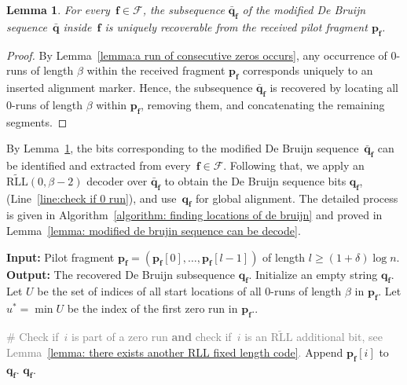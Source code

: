 \documentclass[journal,letterpaper,onecolumn,11pt]{IEEEtran}
\newcommand{\cF}{\mathcal{F}}
\newcommand{\boldf}{\mathbf{f}}
\newcommand{\boldp}{\mathbf{p}}
\newcommand{\boldq}{\mathbf{q}}
\newtheorem{lemma}{Lemma}
\newcommand{\gray}[1]{\textcolor{gray}{#1}}
\begin{document}
\begin{lemma}\label{lemma:correctly identify modified db from pilot}
For every~$\boldf\in \cF$, the subsequence $\bar{\mathbf{q}}_{\boldf}$ of the modified De Bruijn sequence~$\bar{\boldq}$ inside~$\boldf$ is uniquely recoverable from the received pilot fragment $\mathbf{p}_{\boldf}$.
\end{lemma}
\begin{proof}
By Lemma~\ref{lemma:a run of consecutive zeros occurs}, any occurrence of $0$-runs of length $\beta$  within the received fragment $\mathbf{p}_{\boldf}$ corresponds uniquely to an inserted alignment marker.
Hence, the subsequence $\bar{\mathbf{q}}_{\boldf}$ is recovered by locating all $0$-runs of length $\beta$ within $\mathbf{p}_{\boldf}$, removing them, and concatenating the remaining segments.
\end{proof}
By Lemma~\ref{lemma:correctly identify modified db from pilot}, the bits corresponding to the modified De Bruijn sequence~$\bar{\mathbf{q}}_{\boldf}$ can be identified and extracted from every~$\boldf\in \cF$.
Following that, we apply an $\widetilde{\mathrm{RLL}}(0,\beta-2)$ decoder over $\bar{\mathbf{q}}_{\boldf}$ to obtain the De Bruijn sequence bits $\mathbf{q}_{\boldf}$, (Line~\ref{line:check if 0 run}), and use~$\boldq_\boldf$ for global alignment.
The detailed process is given in Algorithm~\ref{algorithm: finding locations of de bruijn} and proved in Lemma~\ref{lemma: modified de brujin sequence can be decode}.
\begin{algorithm}
\caption{Extraction of De Bruijn subsequence $\boldq_{\boldf}$ from a pilot fragment $\boldp_{\boldf}$} 
\begin{algorithmic}[1]\label{algorithm: finding locations of de bruijn}
\STATE \textbf{Input:} Pilot fragment $\mathbf{p}_{\boldf} = (\mathbf{p}_{\boldf}[0], \dots, \mathbf{p}_{\boldf}[l-1])$ of length $l \geq (1+\delta)\log n$.
\STATE \textbf{Output:} The recovered De Bruijn subsequence $\boldq_\boldf$.
\STATE Initialize an empty string $\mathbf{q}_{\boldf}$.
\STATE Let $U$ be the set of indices of all start locations of all $0$-runs of length $\beta$ in $\boldp_{\boldf}$.
\STATE Let $u^*=\min  U$ be the index of the first zero run in $\boldp_\boldf$..\label{line:find u*}
    
    \label{line:check if 0 run}
        \STATE \gray{\# Check if~$i$ is part of a zero run \textbf{and} check if~$i$ is an $\widetilde{\mathrm{RLL}}$ additional bit, see Lemma~\ref{lemma: there exists another RLL fixed length code}.}
            \STATE Append $\mathbf{p}_{\boldf}[i]$ to $\mathbf{q}_{\boldf}$.
    \ENDIF
\ENDFOR
\RETURN $\mathbf{q}_{\boldf}$.
\end{algorithmic}
\end{algorithm}
\end{document}
